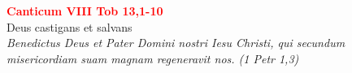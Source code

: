 


\def\greinitialformat#1{%
{\fontsize{39}{39}\selectfont #1}%
}




\vspace{0.3cm}
\begin{center}
 \textcolor{red}{\large \bf Canticum VIII Tob 13,1-10}\\
Deus castigans et salvans\\
\textit{\small Benedictus Deus et Pater Domini nostri Iesu Christi, qui secundum misericordiam suam magnam regeneravit nos.
(1 Petr 1,3)}
\end{center}

